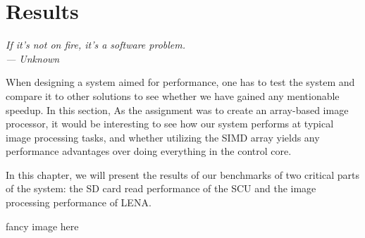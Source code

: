 \chapter{Results}\label{ch:res}

\begin{flushright}{\slshape
    If it's not on fire, it's a software problem.\\ \medskip
    --- Unknown}
\end{flushright}

When designing a system aimed for performance, one has to test the system and
compare it to other solutions to see whether we have gained any mentionable
speedup. In this section, As the assignment was to create an array-based
image processor, it would be interesting to see how our system performs
at typical image processing tasks, and whether utilizing the \ac{SIMD}
array yields any performance advantages over doing everything in the
control core. 


In this chapter, we will present the results of our benchmarks of two
critical parts of the system: the SD card read performance of the
\ac{SCU} and the image processing performance of LENA.


{\sc fancy image here}



